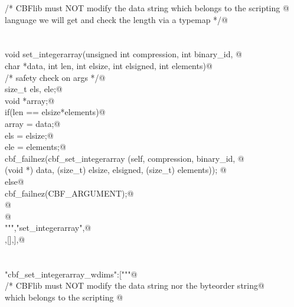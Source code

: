 \documentclass[10pt,a4paper,twoside,notitlepage]{article}
\begin{document}
\begin{flushleft}
\begin{list}{}{}
\mbox{}\verb@    /* CBFlib must NOT modify the data string which belongs to the scripting @\\
\mbox{}\verb@       language we will get and check the length via a typemap */@\\
\mbox{}\verb@@\\
\mbox{}\verb@%apply (char *STRING, int LENGTH) { (char *data, int len) } set_integerarray;@\\
\mbox{}\verb@@\\
\mbox{}\verb@    void set_integerarray(unsigned int compression, int binary_id, @\\
\mbox{}\verb@             char *data, int len, int elsize, int elsigned, int elements){@\\
\mbox{}\verb@        /* safety check on args */@\\
\mbox{}\verb@        size_t els, ele;@\\
\mbox{}\verb@        void *array;@\\
\mbox{}\verb@        if(len == elsize*elements){@\\
\mbox{}\verb@           array = data;@\\
\mbox{}\verb@           els = elsize;@\\
\mbox{}\verb@           ele = elements;@\\
\mbox{}\verb@           cbf_failnez(cbf_set_integerarray (self, compression, binary_id, @\\
\mbox{}\verb@           (void *) data,  (size_t) elsize, elsigned, (size_t) elements)); @\\
\mbox{}\verb@        }else{@\\
\mbox{}\verb@           cbf_failnez(CBF_ARGUMENT);@\\
\mbox{}\verb@        }@\\
\mbox{}\verb@    }@\\
\mbox{}\verb@""","set_integerarray",@\\
\mbox{},[],],@\\
\mbox{}\verb@@\\
\mbox{}\verb@@\\
\mbox{}\verb@"cbf_set_integerarray_wdims":["""@\\
\mbox{}\verb@    /* CBFlib must NOT modify the data string nor the byteorder string@\\
\mbox{}\verb@       which belongs to the scripting @\\

\end{list}
\end{flushleft}
\end{document}
